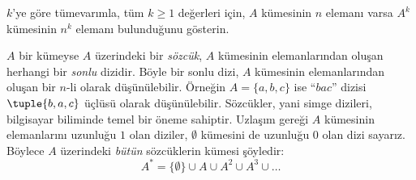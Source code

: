 \begin{prob}
$k$'ye göre tümevarımla, tüm $k \ge 1$ değerleri için, $A$ kümesinin $n$
elemanı varsa $A^k$ kümesinin $n^k$ elemanı bulunduğunu
gösterin.
\end{prob}

\begin{ex}
$A$ bir kümeyse $A$ üzerindeki bir \emph{sözcük}, $A$ kümesinin
elemanlarından oluşan herhangi bir \emph{sonlu} dizidir. Böyle bir sonlu dizi,
$A$ kümesinin elemanlarından oluşan bir $n$-li olarak düşünülebilir. Örneğin
$A = \{a, b, c\}$ ise ``$bac$'' dizisi $\tuple{b, a, c}$ üçlüsü olarak
düşünülebilir. Sözcükler, yani simge dizileri, bilgisayar biliminde temel bir
öneme sahiptir. Uzlaşım gereği $A$ kümesinin elemanlarını uzunluğu
$1$ olan diziler, $\emptyset$ kümesini de uzunluğu $0$ olan dizi sayarız.
Böylece $A$ üzerindeki \emph{bütün} sözcüklerin kümesi şöyledir:
\[
A^* = \{\emptyset\} \cup A \cup A^2 \cup A^3 \cup \dots
\]
\end{ex}

